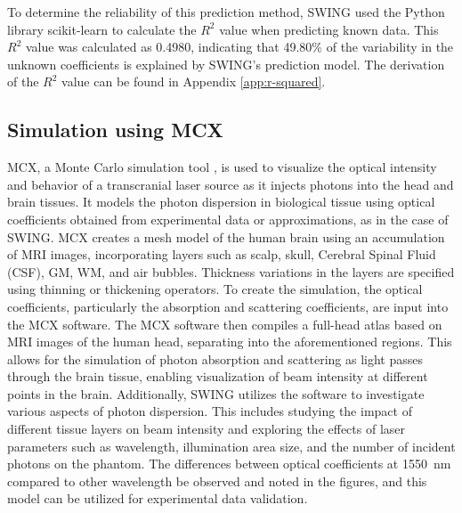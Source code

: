 \documentclass[journal,twoside,web]{ieeecolor}
\begin{document}
To determine the reliability of this prediction method, SWING used the Python library scikit-learn\cite{b7} 
to calculate the $R^2$ value when predicting known data. This $R^2$ value was calculated as 0.4980, indicating 
that 49.80\% of the variability in the unknown coefficients is explained by SWING's prediction model. The derivation 
of the $R^2$ value can be found in Appendix \ref{app:r-squared}.

\subsection{Simulation using MCX}
MCX, a Monte Carlo simulation tool \cite{b6}, is used to visualize the optical intensity and behavior of a transcranial laser source as it injects photons into the head and brain tissues. 
It models the photon dispersion in biological tissue using optical coefficients obtained from experimental data or approximations, as in the case of SWING. 
MCX creates a mesh model of the human brain using an accumulation of MRI images, incorporating layers such as scalp, skull, Cerebral Spinal Fluid (CSF), GM, WM, 
and air bubbles. Thickness variations in the layers are specified using thinning or thickening operators. \cite{b9} To create the simulation, the optical coefficients, 
particularly the absorption and scattering coefficients, are input into the MCX software. The MCX software then compiles a full-head atlas based on MRI images of the human head, separating into the 
aforementioned regions\cite {b10}. This allows for the simulation of photon absorption and scattering as light passes through the brain tissue, enabling visualization of beam intensity 
at different points in the brain. Additionally, SWING utilizes the software to investigate various aspects of photon dispersion. This includes studying the impact of different tissue layers 
on beam intensity and exploring the effects of laser parameters such as wavelength, illumination area size, and the number of incident photons on the phantom. The differences between 
optical coefficients at 1550~nm compared to other wavelength be observed and noted in the figures, and this model can be utilized for experimental data validation.
\end{document}
